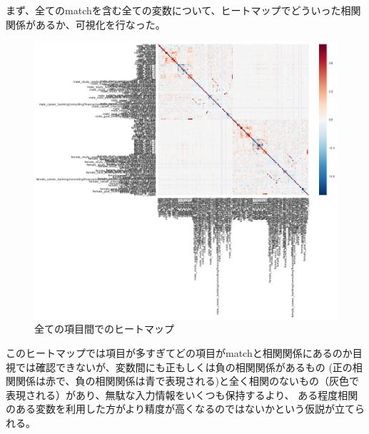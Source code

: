 \documentclass[uplatex]{jsarticle}
\begin{document}
まず、全てのmatchを含む全ての変数について、ヒートマップでどういった相関関係があるか、可視化を行なった。
\begin{figure}
  \begin{center}
    \includegraphics[width=15cm]{img/full_colormap.png}
    \caption{全ての項目間でのヒートマップ}
  \end{center}
\end{figure}
このヒートマップでは項目が多すぎてどの項目がmatchと相関関係にあるのか目視では確認できないが、変数間にも正もしくは負の相関関係があるもの
(正の相関関係は赤で、負の相関関係は青で表現される)と全く相関のないもの（灰色で表現される）があり、無駄な入力情報をいくつも保持するより、
ある程度相関のある変数を利用した方がより精度が高くなるのではないかという仮説が立てられる。
\end{document}
